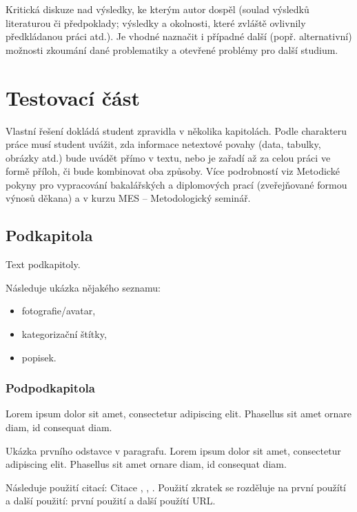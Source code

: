 Kritická diskuze nad výsledky, ke kterým autor dospěl (soulad výsledků  literaturou či předpoklady;
výsledky a okolnosti, které zvláště ovlivnily předkládanou práci atd.). Je vhodné naznačit i případné další
(popř. alternativní) možnosti zkoumání dané problematiky a otevřené problémy pro další studium.

\section{Testovací část}


Vlastní řešení dokládá student zpravidla v několika kapitolách. Podle charakteru práce musí student uvážit, zda informace
netextové povahy (data, tabulky, obrázky atd.) bude uvádět přímo v textu, nebo je zařadí až za celou práci ve formě příloh, či bude kombinovat oba způsoby.
Více podrobností viz Metodické pokyny pro vypracování bakalářských a diplomových prací (zveřejňované formou výnosů děkana)
a v kurzu MES – Metodologický seminář.

	\subsection{Podkapitola}

	Text podkapitoly.

	Následuje ukázka nějakého seznamu:
	\begin{itemize}
		\item fotografie/avatar,
		\item kategorizační štítky,
		\item popisek.
	\end{itemize}

		\subsubsection{Podpodkapitola}

		Lorem ipsum dolor sit amet, consectetur adipiscing elit. Phasellus sit amet ornare diam, id consequat diam.


			\noindent Ukázka prvního odstavce v paragrafu. Lorem ipsum dolor sit amet, consectetur adipiscing elit. Phasellus sit amet ornare diam, id consequat diam.

			Následuje použití citací: Citace \cite{html_hypertext_markup_language}, \cite{hibernate_docs}, \cite{ddd_quickly}.
			Použití zkratek se rozděluje na první použítí a další použití: první použití  a další použítí \ac{URL}.

